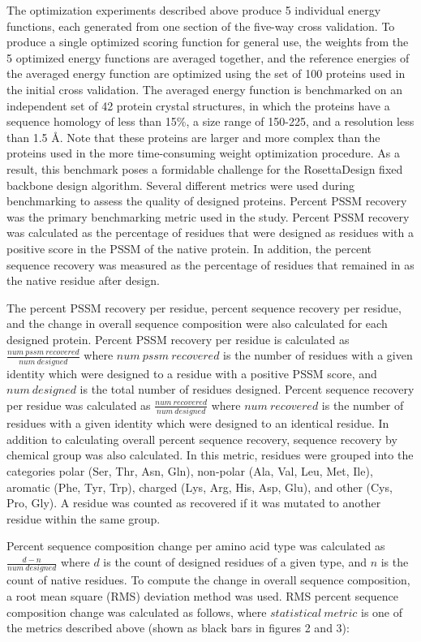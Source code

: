 The optimization experiments described above produce 5 individual energy functions, each generated from one section of the five-way cross validation.
To produce a single optimized scoring function for general use, the weights from the 5 optimized energy functions are averaged together, and the reference energies of the averaged energy function are optimized using the set of 100 proteins used in the initial  cross validation.
The averaged energy function is benchmarked on an independent set of 42 protein crystal structures, in which the proteins have a sequence homology of less than 15\%, a size range of 150-225, and a resolution less than 1.5 \AA.
Note that these proteins are larger and more complex than the proteins used in the more time-consuming weight optimization procedure.
As a result, this benchmark poses a formidable challenge for the RosettaDesign fixed backbone design algorithm.
Several different metrics were used during benchmarking to assess the quality of designed proteins.
Percent PSSM recovery was the primary benchmarking metric used in the study.
Percent PSSM recovery was calculated as the percentage of residues that were designed as residues with a positive score in the PSSM of the native protein.
In addition, the percent sequence recovery was measured as the percentage of residues that remained in as the native residue after design. 

The percent PSSM recovery per residue, percent sequence recovery per residue, and the change in overall sequence composition were also calculated for each designed protein.
Percent PSSM recovery per residue is calculated as $\frac{num\ pssm\ recovered}{num\ designed}$ where $num\ pssm\ recovered$ is the number of residues with a given identity which were designed to a residue with a positive PSSM score, and $num\ designed$ is the total number of residues designed. 
Percent sequence recovery per residue was calculated as $\frac{num\ recovered}{num\ designed}$ where $num\ recovered$ is the number of residues with a given identity which were designed to an identical residue.
In addition to calculating overall percent sequence recovery, sequence recovery by chemical group was also calculated.
In this metric, residues were grouped into the categories polar (Ser, Thr, Asn, Gln), non-polar (Ala, Val, Leu, Met, Ile), aromatic (Phe, Tyr, Trp), charged (Lys, Arg, His, Asp, Glu), and other (Cys, Pro, Gly). 
A residue was counted as recovered if it was mutated to another residue within the same group.

Percent sequence composition change per amino acid type was calculated as $\frac{d-n}{num\ designed}$ where $d$ is the count of designed residues of a given type, and $n$ is the count of native residues.
To compute the change in overall sequence composition, a root mean square (RMS) deviation method was used.
RMS percent sequence composition change was calculated as follows, where $statistical\ metric$ is one of the metrics described above (shown as black bars in figures 2 and 3):

